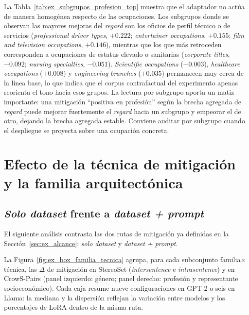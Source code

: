 \documentclass[12pt,a4paper]{report}
\begin{document}
La Tabla~\ref{tab:ex_subgrupos_profesion_top} muestra que el adaptador no actúa de manera homogénea respecto de las ocupaciones. Los subgrupos donde se observan las mayores mejoras del \textit{regard} son los oficios de perfil técnico o de servicios (\textit{professional driver types}, $+0.222$; \textit{entertainer occupations}, $+0.155$; \textit{film and television occupations}, $+0.146$), mientras que los que más retroceden corresponden a ocupaciones de estatus elevado o sanitarias (\textit{corporate titles}, $-0.092$; \textit{nursing specialties}, $-0.051$). \textit{Scientific occupations} ($-0.003$), \textit{healthcare occupations} ($+0.008$) y \textit{engineering branches} ($+0.035$) permanecen muy cerca de la línea base, lo que indica que el corpus contrafactual del experimento apenas reorienta el tono hacia esos grupos. La lectura por subgrupo aporta un matiz importante: una mitigación ``positiva en profesión'' según la brecha agregada de \textit{regard} puede mejorar fuertemente el \textit{regard} hacia un subgrupo y empeorar el de otro, dejando la brecha agregada estable. Conviene auditar por subgrupo cuando el despliegue se proyecta sobre una ocupación concreta.

\FloatBarrier
\section{Efecto de la técnica de mitigación y la familia arquitectónica}
\label{sec:ex_tecnica_familia}

\subsection{\textit{Solo dataset} frente a \textit{dataset + prompt}}
\label{subsec:ex_tecnica_cda}

El siguiente análisis contrasta las dos rutas de mitigación ya definidas en la Sección~\ref{sec:ex_alcance}: \textit{solo dataset} y \textit{dataset + prompt}.

La Figura~\ref{fig:ex_box_familia_tecnica} agrupa, para cada subconjunto familia$\times$técnica, las $\Delta$ de mitigación en StereoSet (\textit{intersentence} e \textit{intrasentence}) y en CrowS-Pairs (panel izquierdo: género; panel derecho: profesión y representante socioeconómico). Cada caja resume nueve configuraciones en GPT-2 o seis en Llama: la mediana y la dispersión reflejan la variación entre modelos y los porcentajes de LoRA dentro de la misma ruta.
\end{document}
